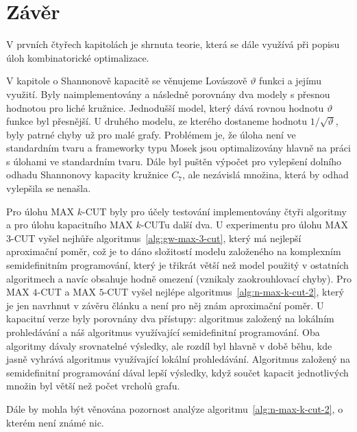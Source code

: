 \chapter*{Závěr}

V prvních čtyřech kapitolách je shrnuta teorie, která se dále využívá při popisu úloh kombinatorické optimalizace.

V kapitole o Shannonově kapacitě se věnujeme Lovászově $\vartheta$ funkci a jejímu využití. Byly naimplementovány a následně porovnány dva modely s přesnou hodnotou pro liché kružnice. Jednodušší model, který dává rovnou hodnotu $\vartheta$ funkce byl přesnější. U druhého modelu, ze kterého dostaneme hodnotu $1/\sqrt{\vartheta}$, byly patrné chyby už pro malé grafy. Problémem je, že úloha není ve standardním tvaru a frameworky typu Mosek jsou optimalizovány hlavně na práci s úlohami ve standardním tvaru. Dále byl puštěn výpočet pro vylepšení dolního odhadu Shannonovy kapacity kružnice $C_7$, ale nezávislá množina, která by odhad vylepšila se nenašla.

Pro úlohu MAX $k$-CUT byly pro účely testování implementovány čtyři algoritmy a pro úlohu kapacitního MAX $k$-CUTu další dva. U experimentu pro úlohu MAX $3$-CUT vyšel nejhůře algoritmus~\ref{alg:gw-max-3-cut}, který má nejlepší aproximační poměr, což je to dáno složitostí modelu založeného na komplexním semidefinitním programování, který je třikrát větší než model použitý v ostatních algoritmech a navíc obsahuje hodně omezení (vznikaly zaokrouhlovací chyby). Pro MAX $4$-CUT a MAX $5$-CUT vyšel nejlépe algoritmus~\ref{alg:n-max-k-cut-2}, který je jen navrhnut v závěru článku \cite{newman} a není pro něj znám aproximační poměr. U kapacitní verze byly porovnány dva přístupy: algoritmus založený na lokálním prohledávání a náš algoritmus využívající semidefinitní programování. Oba algoritmy dávaly srovnatelné výsledky, ale rozdíl byl hlavně v době běhu, kde jasně vyhrává algoritmus využívající lokální prohledávání. Algoritmus založený na semidefinitní programování dával lepší výsledky, když součet kapacit jednotlivých množin byl větší než počet vrcholů grafu. 

Dále by mohla být věnována pozornost analýze algoritmu~\ref{alg:n-max-k-cut-2}, o kterém není známé nic.